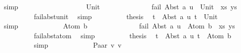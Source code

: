 \begin{isabellebody}
\ simp\isanewline
\ \ \ \ \ \ \isamarkupfalse%
\isanewline
\ \ \ \ \isamarkupfalse%
\isanewline
\ \ \ \ \ \ \isamarkupfalse%
\ Unit\isanewline
\ \ \ \ \ \ %
\isanewline
\ \ \ \ \ \ \isamarkupfalse%
\ {\isachardoublequoteopen}fail\ {\isacharparenleft}{\kern0pt}{\isacharparenleft}{\kern0pt}Abst\ a\ u\ {\isasymapprox}{\isacharquery}{\kern0pt}\ Unit{\isacharparenright}{\kern0pt}\ {\isacharhash}{\kern0pt}\ xs{\isacharcomma}{\kern0pt}\ ys{\isacharparenright}{\kern0pt}{\isachardoublequoteclose}\isanewline
\ \ \ \ \ \ \ \ \isamarkupfalse%
\ fail{\isacharunderscore}{\kern0pt}abst{\isacharunderscore}{\kern0pt}unit\ \isamarkupfalse%
\ simp\isanewline
\ \ \ \ \ \ \isamarkupfalse%
\ \isamarkupfalse%
\ {\isacharquery}{\kern0pt}thesis\ \isamarkupfalse%
\ {\isacartoucheopen}t{}\ {\isacharequal}{\kern0pt}\ Abst\ a\ u{\isacartoucheclose}\ {\isacartoucheopen}t{}\ {\isacharequal}{\kern0pt}\ Unit{\isacartoucheclose}\isanewline
\ \ \ \ \ \ \ \ \isamarkupfalse%
\ simp\isanewline
\ \ \ \ \isamarkupfalse%
\isanewline
\ \ \ \ \ \ \isamarkupfalse%
\ {\isacharparenleft}{\kern0pt}Atom\ b{\isacharparenright}{\kern0pt}\isanewline
\ \ \ \ \ \ %
\isanewline
\ \ \ \ \ \ \isamarkupfalse%
\ {\isachardoublequoteopen}fail\ {\isacharparenleft}{\kern0pt}{\isacharparenleft}{\kern0pt}Abst\ a\ u\ {\isasymapprox}{\isacharquery}{\kern0pt}\ Atom\ b{\isacharparenright}{\kern0pt}\ {\isacharhash}{\kern0pt}\ xs{\isacharcomma}{\kern0pt}\ ys{\isacharparenright}{\kern0pt}{\isachardoublequoteclose}\isanewline
\ \ \ \ \ \ \ \ \isamarkupfalse%
\ fail{\isacharunderscore}{\kern0pt}abst{\isacharunderscore}{\kern0pt}atom\ \isamarkupfalse%
\ simp\isanewline
\ \ \ \ \ \ \isamarkupfalse%
\ \isamarkupfalse%
\ {\isacharquery}{\kern0pt}thesis\ \isamarkupfalse%
\ {\isacartoucheopen}t{}\ {\isacharequal}{\kern0pt}\ Abst\ a\ u{\isacartoucheclose}\ {\isacartoucheopen}t{}\ {\isacharequal}{\kern0pt}\ Atom\ b{\isacartoucheclose}\isanewline
\ \ \ \ \ \ \ \ \isamarkupfalse%
\ simp\isanewline
\ \ \ \ \isamarkupfalse%
\isanewline
\ \ \ \ \ \ \isamarkupfalse%
\ {\isacharparenleft}{\kern0pt}Paar\ v{}\ v{}{\isacharparenright}{\kern0pt}\isanewline

\end{isabellebody}
